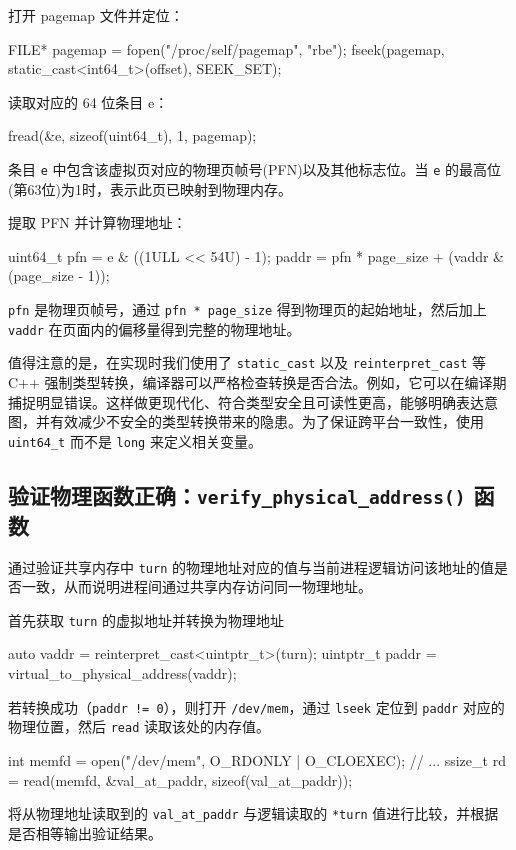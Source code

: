 打开 pagemap 文件并定位：
\begin{cppcode}
FILE* pagemap = fopen("/proc/self/pagemap", "rbe");
fseek(pagemap, static_cast<int64_t>(offset), SEEK_SET);
\end{cppcode}

读取对应的 64 位条目 e：
\begin{cppcode}
fread(&e, sizeof(uint64_t), 1, pagemap);
\end{cppcode}
条目 \texttt{e} 中包含该虚拟页对应的物理页帧号(PFN)以及其他标志位。当 \texttt{e} 的最高位(第63位)为1时，表示此页已映射到物理内存。

提取 PFN 并计算物理地址：
\begin{cppcode}
uint64_t pfn = e & ((1ULL << 54U) - 1);
paddr = pfn * page_size + (vaddr & (page_size - 1));
\end{cppcode}
\texttt{pfn} 是物理页帧号，通过 \texttt{pfn * page\_size} 得到物理页的起始地址，然后加上 \texttt{vaddr} 在页面内的偏移量得到完整的物理地址。

值得注意的是，在实现时我们使用了 \texttt{static\_cast} 以及 \texttt{reinterpret\_cast} 等 C++ 强制类型转换，编译器可以严格检查转换是否合法。例如，它可以在编译期捕捉明显错误。这样做更现代化、符合类型安全且可读性更高，能够明确表达意图，并有效减少不安全的类型转换带来的隐患。为了保证跨平台一致性，使用 \texttt{uint64\_t} 而不是 \texttt{long} 来定义相关变量。

\subsection{验证物理函数正确：\texttt{verify\_physical\_address()} 函数}
通过验证共享内存中 \texttt{turn} 的物理地址对应的值与当前进程逻辑访问该地址的值是否一致，从而说明进程间通过共享内存访问同一物理地址。

首先获取 \texttt{turn} 的虚拟地址并转换为物理地址
\begin{bashcode}
auto vaddr = reinterpret_cast<uintptr_t>(turn);
uintptr_t paddr = virtual_to_physical_address(vaddr);
\end{bashcode}

若转换成功（\texttt{paddr != 0}），则打开 \texttt{/dev/mem}，通过 \texttt{lseek} 定位到 \texttt{paddr} 对应的物理位置，然后 \texttt{read} 读取该处的内存值。
\begin{cppcode}
int memfd = open("/dev/mem", O_RDONLY | O_CLOEXEC);
// ...
ssize_t rd = read(memfd, &val_at_paddr, sizeof(val_at_paddr));
\end{cppcode}

将从物理地址读取到的 \texttt{val\_at\_paddr} 与逻辑读取的 \texttt{*turn} 值进行比较，并根据是否相等输出验证结果。

